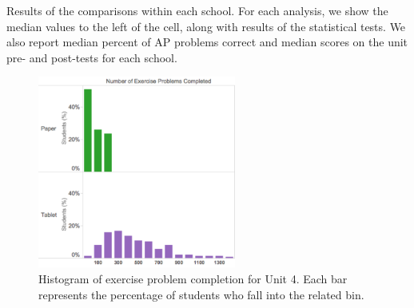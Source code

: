 \documentclass{sigchi}
\begin{document}

\begin{table}[!htb]
\begin{center}

\end{center}
\vspace{0.05in}
\caption{\label{tab:ProblemSolvingStats} Results of the comparisons within each school. For each analysis, we show the median values to the left of the cell, along with results of the statistical tests. We also report median percent of AP problems correct and median scores on the unit pre- and post-tests for each school.}
\end{table}

\begin{figure}[t]
\centering
\includegraphics[width=65mm]{images/exercise_histogram.pdf}
\caption{Histogram of exercise problem completion for Unit 4. Each bar represents the percentage of students who fall into the related bin.}
\label{fig:ProblemSolvingEX}
\end{figure}
\end{document}
